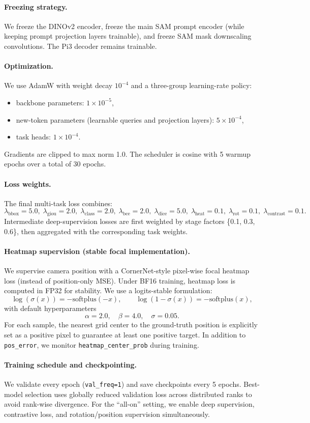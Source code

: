 \paragraph{Freezing strategy.}
We freeze the DINOv2 encoder, freeze the main SAM prompt encoder (while keeping prompt projection layers trainable), and freeze SAM mask downscaling convolutions.
The Pi3 decoder remains trainable.

\paragraph{Optimization.}
We use AdamW with weight decay $10^{-4}$ and a three-group learning-rate policy:
\begin{itemize}
  \item backbone parameters: $1\times10^{-5}$,
  \item new-token parameters (learnable queries and projection layers): $5\times10^{-4}$,
  \item task heads: $1\times10^{-4}$.
\end{itemize}
Gradients are clipped to max norm 1.0.
The scheduler is cosine with 5 warmup epochs over a total of 30 epochs.

\paragraph{Loss weights.}
The final multi-task loss combines:
\[
\lambda_{\text{bbox}}=5.0,\;
\lambda_{\text{giou}}=2.0,\;
\lambda_{\text{class}}=2.0,\;
\lambda_{\text{bce}}=2.0,\;
\lambda_{\text{dice}}=5.0,\;
\lambda_{\text{heat}}=0.1,\;
\lambda_{\text{rot}}=0.1,\;
\lambda_{\text{contrast}}=0.1.
\]
Intermediate deep-supervision losses are first weighted by stage factors \{0.1, 0.3, 0.6\}, then aggregated with the corresponding task weights.

\paragraph{Heatmap supervision (stable focal implementation).}
We supervise camera position with a CornerNet-style pixel-wise focal heatmap loss (instead of position-only MSE).
Under BF16 training, heatmap loss is computed in FP32 for stability.
We use a logits-stable formulation:
\[
\log(\sigma(x))=-\mathrm{softplus}(-x),\qquad
\log(1-\sigma(x))=-\mathrm{softplus}(x),
\]
with default hyperparameters
\[
\alpha=2.0,\quad \beta=4.0,\quad \sigma=0.05.
\]
For each sample, the nearest grid center to the ground-truth position is explicitly set as a positive pixel to guarantee at least one positive target.
In addition to \texttt{pos\_error}, we monitor \texttt{heatmap\_center\_prob} during training.

\paragraph{Training schedule and checkpointing.}
We validate every epoch (\texttt{val\_freq=1}) and save checkpoints every 5 epochs.
Best-model selection uses globally reduced validation loss across distributed ranks to avoid rank-wise divergence.
For the ``all-on'' setting, we enable deep supervision, contrastive loss, and rotation/position supervision simultaneously.

